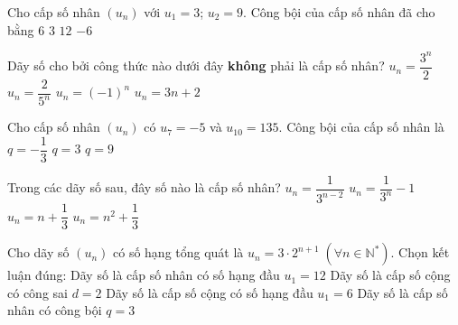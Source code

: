 \begin{ex}%
	Cho cấp số  nhân $(u_n)$ với $u_1 = 3$; $u_2 = 9$. Công bội của cấp số nhân đã cho bằng
	\choice 
		{$6$} 
		 {\True $3$}
		{$12$} 
		 {$-6$}
\end{ex}

\begin{ex}%
	Dãy số cho bởi công thức nào dưới đây \textbf{không} phải là cấp  số nhân?
	\choice 
		{$u_n=\dfrac{3^n}{2}$} 
		{$u_n=\dfrac{2}{5^n}$} 
		 {$u_n=\left(-1\right)^n$}
		{\True  $u_n=3n+2$}
\end{ex}

\begin{ex}%
	Cho cấp số nhân $(u_{n})$ có $u_{7}=-5$ và  $u_{10}=135$. Công bội của cấp số nhân là
		 {$q=-\dfrac{1}{3}$}
		{$q=3$} 
		{$q=9$} 
\end{ex}

\begin{ex}%
	Trong các dãy số sau, đây số nào là cấp  số nhân?
	 \choice
		{\True  $u_n=\dfrac{1}{3^{n-2}}$}
		 {$u_n=\dfrac{1}{3^n}-1$}
		{$u_n=n+\dfrac{1}{3}$} 
		 {$u_n=n^2+\dfrac{1}{3}$}
\end{ex}

\begin{ex}%
	Cho dãy số $(u_n)$ có số  hạng tổng quát là $u_n=3\cdot 2^{n+1}\; \left(\forall n\in {{\mathbb{N}}^*}\right)$. Chọn kết luận đúng:
	 \choice
		{\True Dãy số là cấp số nhân có số hạng đầu  $u_1=12$}
		{Dãy số là cấp số cộng có  công sai $d=2$}
		{Dãy số  là cấp số cộng có số hạng đầu $u_1=6$}
		{Dãy số  là cấp số nhân có công bội $q=3$}
\end{ex}

